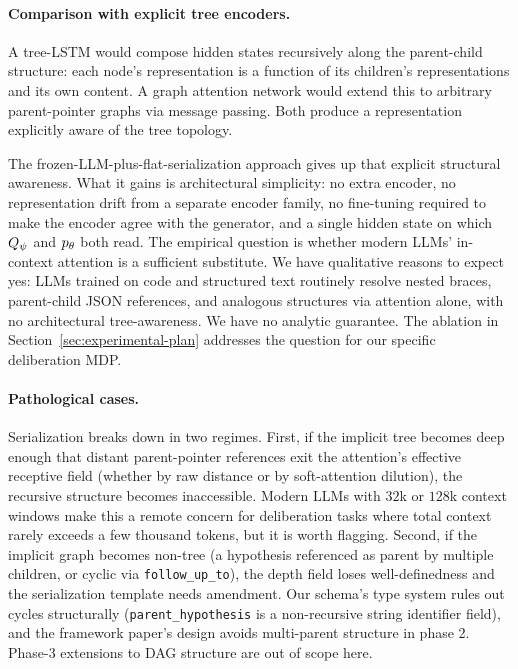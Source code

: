\paragraph{Comparison with explicit tree encoders.}
A tree-LSTM \citep{tai2015improved} would compose hidden states
recursively along the parent-child structure: each node's representation
is a function of its children's representations and its own content. A
graph attention network \citep{velickovic2018gat} would extend this to
arbitrary parent-pointer graphs via message passing. Both produce a
representation explicitly aware of the tree topology.

The frozen-LLM-plus-flat-serialization approach gives up that explicit
structural awareness. What it gains is architectural simplicity: no
extra encoder, no representation drift from a separate encoder family,
no fine-tuning required to make the encoder agree with the generator,
and a single hidden state on which $Q_{\psi}$ and $p_{\theta}$ both read. The
empirical question is whether modern LLMs' in-context attention is
a sufficient substitute. We have qualitative reasons to expect yes:
LLMs trained on code and structured text routinely resolve nested
braces, parent-child JSON references, and analogous structures via
attention alone, with no architectural tree-awareness. We have no
analytic guarantee. The ablation in
Section~\ref{sec:experimental-plan} addresses the question for our
specific deliberation MDP.

\paragraph{Pathological cases.}
Serialization breaks down in two regimes. First, if the implicit tree
becomes deep enough that distant parent-pointer references exit the
attention's effective receptive field (whether by raw distance or by
soft-attention dilution), the recursive structure becomes inaccessible.
Modern LLMs with $32$k or $128$k context windows make this a remote
concern for deliberation tasks where total context rarely exceeds a few
thousand tokens, but it is worth flagging. Second, if the implicit
graph becomes non-tree (a hypothesis referenced as parent by multiple
children, or cyclic via \texttt{follow\_up\_to}), the depth field loses
well-definedness and the serialization template needs amendment. Our
schema's type system rules out cycles structurally
(\texttt{parent\_hypothesis} is a non-recursive string identifier
field), and the framework paper's design avoids multi-parent structure
in phase 2. Phase-3 extensions to DAG structure are out of scope here.

